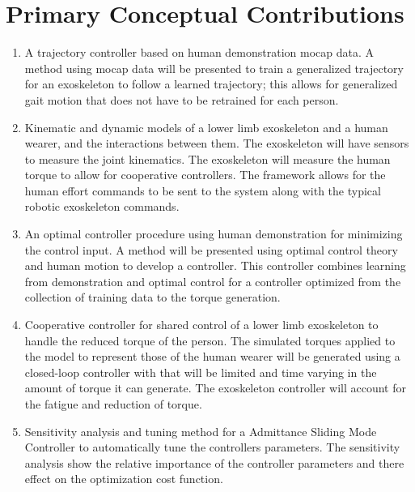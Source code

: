\section{Primary Conceptual Contributions}
\begin{enumerate}[wide, nosep, labelindent = 0pt, topsep = 1ex]
     \item A trajectory controller based on human demonstration mocap data. A method using mocap data will be presented to train a generalized trajectory for an exoskeleton to follow a learned trajectory; this allows for generalized gait motion that does not have to be retrained for each person. 
    \item  Kinematic and dynamic models of a lower limb exoskeleton and a human wearer, and the interactions between them. The exoskeleton will have sensors to measure the joint kinematics. The exoskeleton will measure the human torque to allow for cooperative controllers. The framework allows for the human effort commands to be sent to the system along with the typical robotic exoskeleton commands. 
    \item An optimal controller procedure using human demonstration for minimizing the control input. A method will be presented using optimal control theory and human motion to develop a controller. This controller combines learning from demonstration and optimal control for a controller optimized from the collection of training data to the torque generation. 
    \item Cooperative controller for shared control of a lower limb exoskeleton to handle the reduced torque of the person. The simulated torques applied to the model to represent those of the human wearer will be generated using a closed-loop controller with that will be limited and time varying in the amount of torque it can generate. The exoskeleton controller will account for the fatigue and reduction of torque. 
    \item Sensitivity analysis and tuning method for a Admittance Sliding Mode Controller to automatically tune the controllers parameters. The sensitivity analysis show the relative importance of the controller parameters and there effect on the optimization cost function.  
\end{enumerate}

